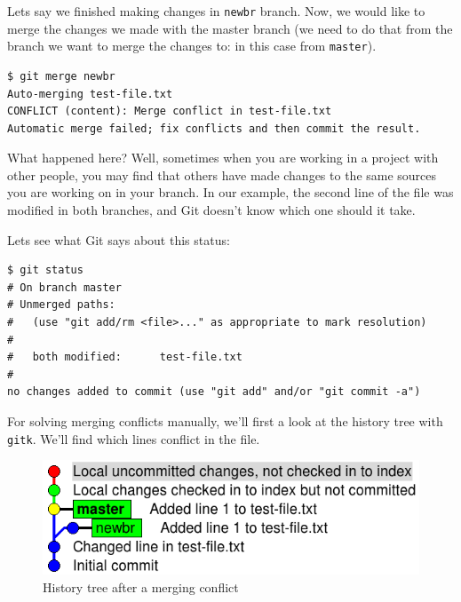 \documentclass[a4paper,10pt]{article}
\newenvironment{terminal}
  {
    \vspace{+10pt}
    \begin{center}
    \begin{minipage}{0.95\textwidth}
    \begin{framed}
  }
  {
    \end{framed}
    \end{minipage}
    \end{center}
    \vspace{+10pt}
  }
\begin{document}
Lets say we finished making changes in \texttt{newbr} branch. Now, we
would like to merge the changes we made with the master branch (we
need to do that from the branch we want to merge the changes to: in
this case from \texttt{master}).

\begin{terminal}
\begin{verbatim}
$ git merge newbr
Auto-merging test-file.txt
CONFLICT (content): Merge conflict in test-file.txt
Automatic merge failed; fix conflicts and then commit the result.
\end{verbatim}
\end{terminal}

What happened here? Well, sometimes when you are working in a project
with other people, you may find that others have made changes to the
same sources you are working on in your branch. In our example, the
second line of the file was modified in both branches, and Git doesn't
know which one should it take.

Lets see what Git says about this status:

\begin{terminal}
\begin{verbatim}
$ git status
# On branch master
# Unmerged paths:
#   (use "git add/rm <file>..." as appropriate to mark resolution)
#
#	both modified:      test-file.txt
#
no changes added to commit (use "git add" and/or "git commit -a")
\end{verbatim}
\end{terminal}

For solving merging conflicts manually, we'll first a look at the
history tree with \texttt{gitk}. We'll find which lines conflict in
the file.

\begin{figure}[h]
  \begin{center}
    \includegraphics[scale=0.5]{git_example-07}
  \end{center}
  \caption{History tree after a merging conflict}
\end{figure}
\end{document}
